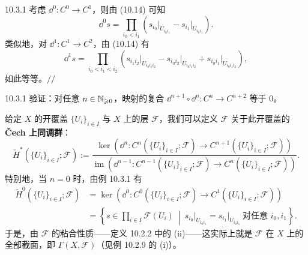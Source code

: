 
\begin{wexam}{10.3.1}
考虑 $\dd^0:C^0\to C^1$，则由 (10.14) 可知
\[
\dd^0s=\prod_{i_0<i_1}
\left(s_{i_0}\big|_{U_{i_0i_1}}-s_{i_1}\big|_{U_{i_0i_1}}\right).
\]
类似地，对 $\dd^1:C^1\to C^2$，由 (10.14) 有
\[
\dd^1s=\prod_{i_0<i_1<i_2}
\left(s_{i_1i_2}\big|_{U_{i_0i_1i_2}}
-s_{i_0i_2}\big|_{U_{i_0i_1i_2}}
+s_{i_0i_1}\big|_{U_{i_0i_1i_2}}\right),
\]
如此等等。\hfill$//$
\end{wexam}

\begin{wexer}{10.3.1}
验证：对任意 $n\in\mathbb{N}_{\geqslant0}$，映射的复合
$\dd^{n+1}\circ\dd^n:C^n\to C^{n+2}$ 等于 $0$。
\end{wexer}

给定 $X$ 的开覆盖 $\{U_i\}_{i\in I}$ 与 $X$ 上的层 $\mathcal F$，我们可以定义
$\mathcal F$ 关于此开覆盖的\textbf{Čech 上同调群}：
\begin{equation}\tag{10.15}
\check H^*(\{U_i\}_{i\in I};\mathcal F):=
\frac{\ker\left(\dd^n:C^n(\{U_i\}_{i\in I};\mathcal F)
\to C^{n+1}(\{U_i\}_{i\in I};\mathcal F)\right)}
{\operatorname{im}\left(\dd^{n-1}:C^{n-1}(\{U_i\}_{i\in I};\mathcal F)
\to C^n(\{U_i\}_{i\in I};\mathcal F)\right)}.
\end{equation}
特别地，当 $n=0$ 时，由例 10.3.1 有
\begin{align*}
\check H^0(\{U_i\}_{i\in I};\mathcal F)
&=\ker\left(\dd^0:C^0(\{U_i\}_{i\in I};\mathcal F)\to
C^1(\{U_i\}_{i\in I};\mathcal F)\right)\\
&=\left\{s\in\prod_{i\in I}\mathcal F(U_i)\ \middle|\
s_{i_0}\big|_{U_{i_0i_1}}=s_{i_1}\big|_{U_{i_0i_1}}
\ \text{对任意 }i_0,i_1\right\}.
\end{align*}
于是，由 $\mathcal F$ 的粘合性质——定义 10.2.2 中的 (ii)——这实际上就是 $\mathcal F$ 在
$X$ 上的全部截面，即 $\Gamma(X,\mathcal F)$（见例 10.2.9 的 (i)）。


